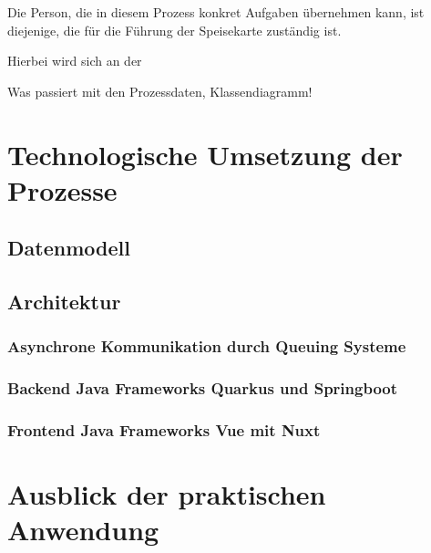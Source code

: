 Die Person, die in diesem Prozess konkret Aufgaben übernehmen kann, ist diejenige, die für die Führung der Speisekarte zuständig ist.

\clearpage
{}

Hierbei wird sich an der 


Was passiert mit den Prozessdaten,  Klassendiagramm!

\section{Technologische Umsetzung der Prozesse}
\label{sec:technologie_prozesse}
\subsection{Datenmodell}
\label{sec:datenmodell}

\subsection{Architektur}

\subsubsection{Asynchrone Kommunikation durch Queuing Systeme}
\subsubsection{Backend Java Frameworks Quarkus und Springboot}
\subsubsection{Frontend Java Frameworks Vue mit Nuxt}

\section{Ausblick der praktischen Anwendung}
\label{sec:zukunft}

